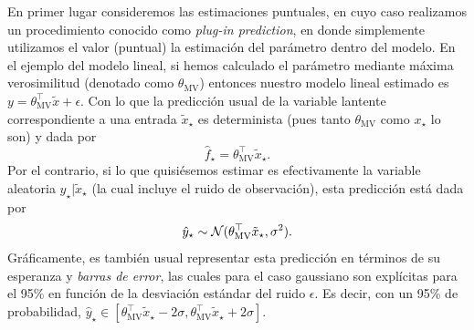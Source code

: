 En primer lugar consideremos las estimaciones puntuales, en cuyo caso realizamos un procedimiento conocido como \emph{plug-in prediction}, en donde simplemente utilizamos el valor (puntual) la estimación del parámetro dentro del modelo. En el ejemplo del modelo lineal, si hemos calculado el parámetro mediante máxima verosimilitud (denotado como $\theta_{\text{MV}}$) entonces nuestro modelo lineal estimado es $y = \theta_{\text{MV}}^\top \tilde{x} + \epsilon$. Con lo que la predicción usual de la variable lantente correspondiente a una entrada $\tilde{x}_\star$ es determinista (pues tanto $\theta_{\text{MV}}$ como $x_\star$ lo son) y dada por
\begin{equation}
	\hat f_\star = \theta_{\text{MV}}^\top \tilde{x}_\star.
\end{equation}
Por el contrario, si lo que quisiésemos estimar es efectivamente la variable aleatoria $y_\star|\tilde{x}_\star$ (la cual incluye el ruido de observación), esta predicción está dada por 
\begin{equation}
	\hat y_\star \sim {\mathcal N}(\theta_{\text{MV}}^\top \tilde{x}_\star,\sigma^2). 
\end{equation}
Gráficamente, es también usual representar esta predicción en términos de su esperanza y \emph{barras de error}, las cuales para el caso gaussiano son explícitas para el 95\% en función de la desviación estándar del ruido $\epsilon$. Es decir, con un 95\% de probabilidad, $\hat y_\star\in[\theta_{\text{MV}}^\top \tilde{x}_\star - 2\sigma,\theta_{\text{MV}}^\top \tilde{x}_\star + 2\sigma]$. \\

